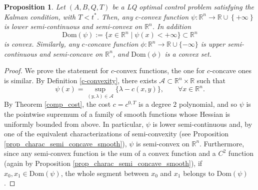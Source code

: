 \documentclass[reqno]{amsart}
\theoremstyle{plain}
\newtheorem{prop}[thm]{Proposition}
\theoremstyle{definition}
\theoremstyle{remark}
\newcommand{\R}{\mathbb{R}}
\begin{document}
	\begin{prop}\label{Kant_potentials_are_semi-convex}
        Let $(A,B,Q,T)$ be a LQ optimal control problem satisfying the Kalman condition, with $T<t^*$. Then, any $c$-convex function  $\psi:\mathbb{R}^n\to\mathbb{R}\cup\left\{+\infty\right\}$ is lower semi-continuous and semi-convex on $\mathbb{R}^n$. In addition
        \begin{equation}
            \mathrm{Dom}(\psi):=\{x\in\mathbb{R}^n\mid \psi(x)<+\infty\} \subset \R^n
        \end{equation}
        is convex. Similarly, any $c$-concave function $\phi: \mathbb{R}^n\to \mathbb{R}\cup \{-\infty\}$ is upper semi-continuous and semi-concave on $\mathbb{R}^n$, and $\mathrm{Dom}(\phi)$ is a convex set.
        \end{prop}
	\begin{proof} 
We prove the statement for $c$-convex functions, the one for $c$-concave ones is similar. By Definition \ref{c-convexity}, there exists $\mathcal{A} \subset \R^n \times \R$ such that
 \begin{equation}
      \psi(x) = \sup_{(y,\lambda) \in \mathcal{A}} \{\lambda - c(x,y)\}, \qquad \forall x \in \R^n.
       \end{equation}
By Theorem \ref{comp_cost}, the cost $c=c^{0,T}$ is a degree $2$  polynomial, and so $\psi$ is the pointwise supremum of a family of smooth functions whose Hessian is uniformly bounded from above. In particular, $\psi$ is lower semi-continuous and, by one of the equivalent characterizations of semi-convexity (see Proposition \ref{prop_charac_semi_concave_smooth}), $\psi$ is semi-convex on $\R^n$. Furthermore, since any semi-convex function is the sum of a convex function and a $C^2$ function (again by Proposition \ref{prop_charac_semi_concave_smooth}), if $x_0,x_1 \in \mathrm{Dom}(\psi)$, the whole segment between $x_0$ and $x_1$ belongs to $\mathrm{Dom}(\psi)$.
\end{proof}
\end{document}
